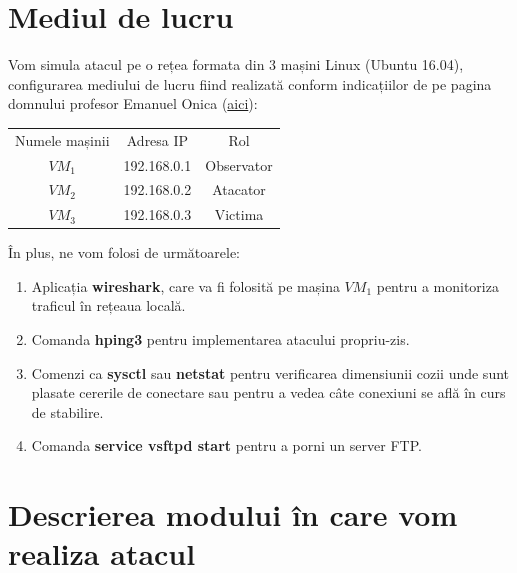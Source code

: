 \documentclass[a4paper]{article}
\begin{document}
\section{Mediul de lucru}

Vom simula atacul pe o rețea formata din 3 mașini Linux (Ubuntu 16.04), configurarea mediului de lucru fiind realizată conform indicațiilor de pe pagina domnului profesor Emanuel Onica (\href{https://profs.info.uaic.ro/~eonica/isec/lab10.html}{aici}):

\begin{center}
    \begin{tabular}{|c|c|c|}
         \hline
         Numele mașinii & Adresa IP & Rol \\
         $ VM_1 $ & 192.168.0.1 & Observator \\
         $ VM_2 $ & 192.168.0.2 & Atacator \\
         $ VM_3 $ & 192.168.0.3 & Victima \\
         \hline
    \end{tabular}
\end{center}

În plus, ne vom folosi de următoarele:

\begin{enumerate}
    \item Aplicația \textbf{wireshark}, care va fi folosită pe mașina $ VM_1 $ pentru a monitoriza traficul în rețeaua locală.

    \item Comanda \textbf{hping3} pentru implementarea atacului propriu-zis.

    \item Comenzi ca \textbf{sysctl} sau \textbf{netstat} pentru verificarea dimensiunii cozii unde sunt plasate cererile de conectare sau pentru a vedea câte conexiuni se află în curs de stabilire.

    \item Comanda \textbf{service vsftpd start} pentru a porni un server FTP.

\end{enumerate}

\section{Descrierea modului în care vom realiza atacul}
\end{document}
